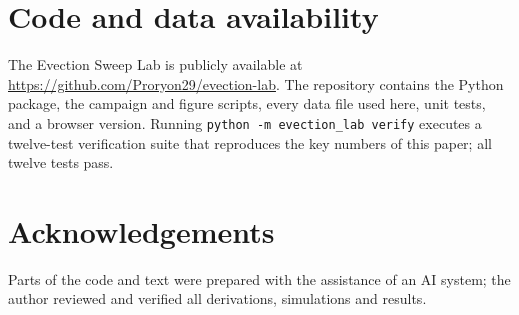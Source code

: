 \documentclass[11pt,a4paper]{article}
\begin{document}
\section*{Code and data availability}
The Evection Sweep Lab is publicly available at \url{https://github.com/Proryon29/evection-lab}. The repository contains the Python package, the campaign and figure scripts, every data file used here, unit tests, and a browser version. Running \texttt{python -m evection\_lab verify} executes a twelve-test verification suite that reproduces the key numbers of this paper; all twelve tests pass.

\section*{Acknowledgements}
Parts of the code and text were prepared with the assistance of an AI system; the author reviewed and verified all derivations, simulations and results.
\end{document}
